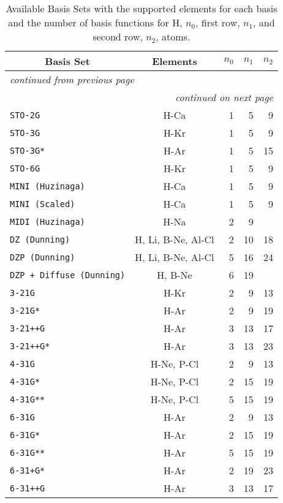 \begin{latexonly}
\begin{longtable}{lcrrr}
\caption{Available Basis Sets with the supported elements for each basis
and the number of basis functions for H, $n_0$, first row, $n_1$, and
second row, $n_2$, atoms.} \\
\hline\hline
  \multicolumn{1}{c}{Basis Set}&
   \multicolumn{1}{c}{Elements}&
   \multicolumn{1}{c}{$n_0$}&
   \multicolumn{1}{c}{$n_1$}&
   \multicolumn{1}{c}{$n_2$} \\
\hline
\endfirsthead
\multicolumn{5}{l}{\small\sl continued from previous page} \\ \hline
\endhead
\hline \multicolumn{5}{r}{\small\sl continued on next page} \\
\endfoot
\hline\hline
\endlastfoot
\verb*|STO-2G| & H-Ca & 1 & 5 & 9 \\
\verb*|STO-3G| & H-Kr & 1 & 5 & 9 \\
\verb*|STO-3G*| & H-Ar & 1 & 5 & 15 \\
\verb*|STO-6G| & H-Kr & 1 & 5 & 9 \\
\verb*|MINI (Huzinaga)| & H-Ca & 1 & 5 & 9 \\
\verb*|MINI (Scaled)| & H-Ca & 1 & 5 & 9 \\
\verb*|MIDI (Huzinaga)| & H-Na & 2 & 9 &  \\
\verb*|DZ (Dunning)| & H, Li, B-Ne, Al-Cl & 2 & 10 & 18 \\
\verb*|DZP (Dunning)| & H, Li, B-Ne, Al-Cl & 5 & 16 & 24 \\
\verb*|DZP + Diffuse (Dunning)| & H, B-Ne & 6 & 19 &  \\
\verb*|3-21G| & H-Kr & 2 & 9 & 13 \\
\verb*|3-21G*| & H-Ar & 2 & 9 & 19 \\
\verb*|3-21++G| & H-Ar & 3 & 13 & 17 \\
\verb*|3-21++G*| & H-Ar & 3 & 13 & 23 \\
\verb*|4-31G| & H-Ne, P-Cl & 2 & 9 & 13 \\
\verb*|4-31G*| & H-Ne, P-Cl & 2 & 15 & 19 \\
\verb*|4-31G**| & H-Ne, P-Cl & 5 & 15 & 19 \\
\verb*|6-31G| & H-Ar & 2 & 9 & 13 \\
\verb*|6-31G*| & H-Ar & 2 & 15 & 19 \\
\verb*|6-31G**| & H-Ar & 5 & 15 & 19 \\
\verb*|6-31+G*| & H-Ar & 2 & 19 & 23 \\
\verb*|6-31++G| & H-Ar & 3 & 13 & 17 \\

\end{longtable}
\end{latexonly}
